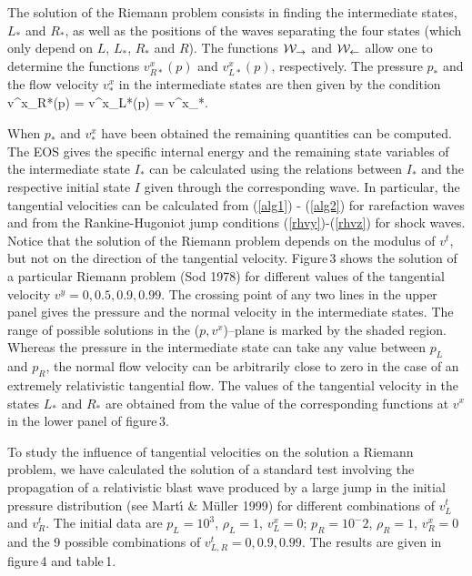   The solution of the Riemann problem consists in finding the
intermediate states, $L_*$ and $R_*$, as well as the positions of the
waves separating the four states (which only depend on $L$, $L_*$,
$R_*$ and $R$). The functions ${\cal W}_{\rightarrow}$ and ${\cal
W}_{\leftarrow}$ allow one to determine the functions $v^x_{R*}(p)$
and $v^x_{L*}(p)$, respectively. The pressure $p_*$ and the flow
velocity $v^x_*$ in the intermediate states are then given by the
condition
\be
v^x_{R*}(p) = v^x_{L*}(p) = v^x_*.
\ee

  When $p_*$ and $v^x_*$ have been obtained the remaining quantities
can be computed. The EOS gives the specific internal energy and the
remaining state variables of the intermediate state $I_*$ can be
calculated using the relations between $I_*$ and the respective
initial state $I$ given through the corresponding wave. In particular,
the tangential velocities can be calculated from (\ref{alg1}) -
(\ref{alg2}) for rarefaction waves and from the Rankine-Hugoniot jump
conditions (\ref{rhvy})-(\ref{rhvz}) for shock waves. Notice that the
solution of the Riemann problem depends on the modulus of $v^t$, but
not on the direction of the tangential velocity.  Figure\,3 shows the
solution of a particular Riemann problem (Sod 1978) for different
values of the tangential velocity $v^y=0, 0.5, 0.9, 0.99$.  The
crossing point of any two lines in the upper panel gives the pressure
and the normal velocity in the intermediate states.  The range of
possible solutions in the ($p, v^x$)--plane is marked by the shaded
region. Whereas the pressure in the intermediate state can take any
value between $p_L$ and $p_R$, the normal flow velocity can be
arbitrarily close to zero in the case of an extremely relativistic
tangential flow. The values of the tangential velocity in the states
$L_*$ and $R_*$ are obtained from the value of the corresponding
functions at $v^x$ in the lower panel of figure\,3.

  To study the influence of tangential velocities on the solution a
Riemann problem, we have calculated the solution of a standard test
involving the propagation of a relativistic blast wave produced by a
large jump in the initial pressure distribution (see Mart\'{\i} \&
M\"uller 1999) for different combinations of $v_L^t$ and $v_R^t$. The
initial data are $p_L=10^3$, $\rho_L=1$, $v^x_L=0$; $p_R=10^-2$,
$\rho_R=1$, $v^x_R=0$ and the 9 possible combinations of $v^t_{L, R} =
0, 0.9, 0.99$. The results are given in figure\,4 and table\,1.

